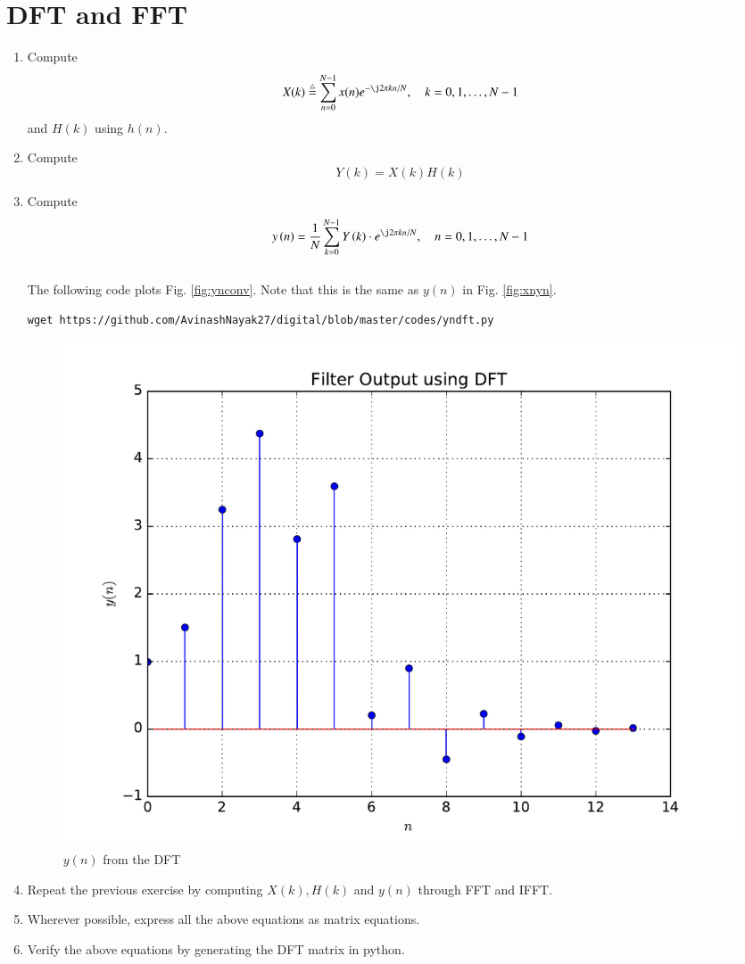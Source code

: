 \documentclass[journal,12pt,twocolumn]{IEEEtran}
\renewcommand\thesection{\arabic{section}}
\begin{document}
\section{DFT and FFT}
\begin{enumerate}[label=\thesection.\arabic*]
\item
Compute
\begin{equation}
X(k) \define \sum _{n=0}^{N-1}x(n) e^{-\j2\pi kn/N}, \quad k = 0,1,\dots, N-1
\end{equation}
and $H(k)$ using $h(n)$.
\item Compute 
\begin{equation}
Y(k) = X(k)H(k)
\end{equation}
\item Compute
\begin{equation}
 y\brak{n}={\frac {1}{N}}\sum _{k=0}^{N-1}Y\brak{k}\cdot e^{\j 2\pi kn/N},\quad n = 0,1,\dots, N-1
\end{equation}
\\
\solution The following code plots Fig. \ref{fig:ynconv}. Note that this is the same as 
$y(n)$ in  Fig. 
\ref{fig:xnyn}. 
%
\begin{lstlisting}
wget https://github.com/AvinashNayak27/digital/blob/master/codes/yndft.py
\end{lstlisting}
\begin{figure}[!ht]
\centering
\includegraphics[width=\columnwidth]{./figs/yndft}
\caption{$y(n)$ from the DFT}
\label{fig:yndft}
\end{figure}

\item Repeat the previous exercise by computing $X(k), H(k)$ and $y(n)$ through FFT and 
IFFT.
\item Wherever possible, express all the above equations as matrix equations.
\item Verify the above equations by generating the DFT matrix in python.
\end{enumerate}
%
\end{document}
